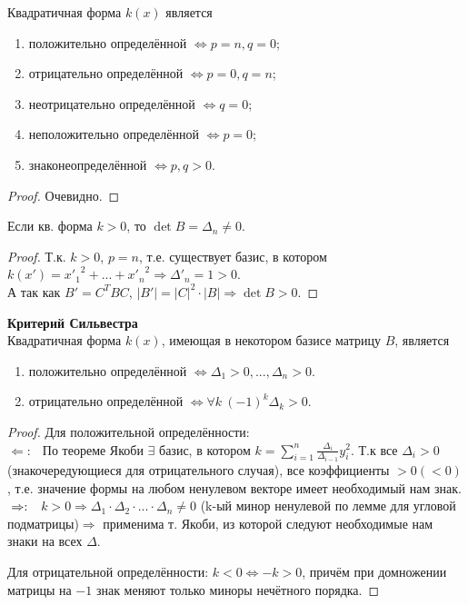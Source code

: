 \begin{subtheorem}
    Квадратичная форма $k(x)$ является
    \begin{enumerate}
        \item положительно определённой $\Leftrightarrow p = n, q = 0$;
        \item отрицательно определённой $\Leftrightarrow p = 0, q = n$;
        \item неотрицательно определённой $\Leftrightarrow q = 0$;
        \item неположительно определённой $\Leftrightarrow p = 0$;
        \item знаконеопределённой $\Leftrightarrow p,q > 0$.
    \end{enumerate}
\end{subtheorem}
\begin{proof}
    Очевидно.
\end{proof}
\begin{lemma}
    Если кв. форма $k > 0$, то $\det B = \Delta_n \neq 0$.
\end{lemma}
\begin{proof}
    Т.к. $k>0$, $p = n$, т.е. существует базис, в котором $k(x') = {x'_1}^2 + ... + {x'_n}^2 \Rightarrow \Delta'_n = 1 > 0$.\\
    А так как $B' = C^TBC$, $|B'| = |C|^2\cdot|B| \Rightarrow \det B > 0$.
\end{proof}
\begin{theorem} \textbf{Критерий Сильвестра}\\
    Квадратичная форма $k(x)$, имеющая в некотором базисе матрицу $B$, является
    \begin{enumerate}
        \item положительно определённой $\Leftrightarrow \Delta_1 > 0,...,\Delta_n > 0$.
        \item отрицательно определённой $\Leftrightarrow \forall k \ (-1)^k\Delta_k > 0$.
    \end{enumerate} 
\end{theorem}
\begin{proof} Для положительной определённости: \\
    $\Leftarrow : \ \ $ По теореме Якоби $\exists$ базис, в котором $k = \sum \limits_{i=1}^{n} \frac{\Delta_i}{\Delta_{i-1}}y_i^2$. Т.к все $\Delta_i > 0$ (знакочередующиеся для отрицательного случая), все коэффициенты $> 0 (< 0)$, т.е. значение формы на любом ненулевом векторе имеет необходимый нам знак.\\
    $\\ \Rightarrow : \ \ $ $k>0 \Rightarrow \Delta_1\cdot\Delta_2\cdot...\cdot\Delta_n \neq 0$ (k-ый минор ненулевой по лемме для угловой подматрицы)$ \Rightarrow$ применима т. Якоби, из которой следуют необходимые нам знаки на всех $\Delta$.

    Для отрицательной определённости: $k < 0 \Leftrightarrow -k > 0$, причём при домножении матрицы на $-1$ знак меняют только миноры нечётного порядка. 
\end{proof}
